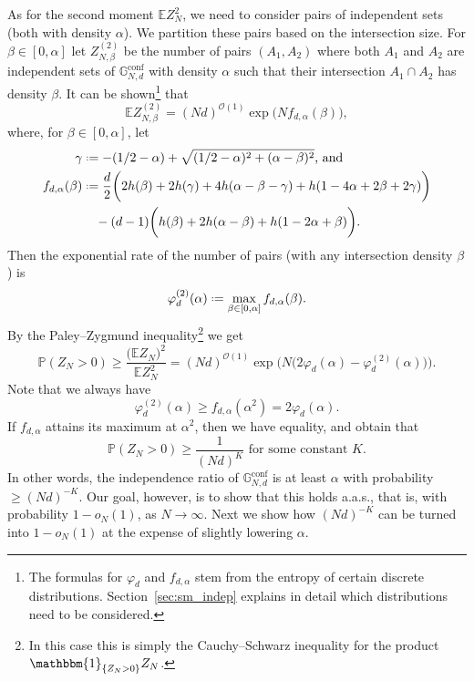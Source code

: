\documentclass[12pt]{amsart}
\theoremstyle{definition}
\newcommand\Eb{\mathbb{E}}  %
\newcommand\Pb{\mathbb{P}}  %
\newcommand\Gbconf{\mathbb{G}^{\textrm{conf}}}
\newcommand\Oc{\mathcal{O}}  %
\newcommand\al{\alpha}
\newcommand\be{\beta}
\newcommand\ga{\gamma}
\newcommand{\defeq}{\mathrel{\vcenter{\baselineskip0.5ex \lineskiplimit0pt
                     \hbox{\scriptsize.}\hbox{\scriptsize.}}}%
                     =}
\newcommand\ind{\mathbbm{1}} %
\begin{document}
As for the second moment $\Eb Z_N^2$, we need to consider pairs of independent sets (both with density $\al$). We partition these pairs based on the intersection size. For $\be \in [0,\al]$ let $Z^{(2)}_{N,\be}$ be the number of pairs $(A_1,A_2)$ where both $A_1$ and $A_2$ are independent sets of $\Gbconf_{N,d}$ with density $\al$ such that their intersection $A_1 \cap A_2$ has density $\be$. It can be shown\footnote{The formulas for $\varphi_d$ and $f_{d,\al}$ stem from the entropy of certain discrete distributions. Section~\ref{sec:sm_indep} explains in detail which distributions need to be considered.} that
%
\[ \Eb Z^{(2)}_{N,\be} =
(Nd)^{\Oc(1)} 
\exp\big( N f_{d,\al}(\be) \big) , \]
%
where, for $\be \in [0,\al]$, let 
%
\begin{align}
\begin{split} \label{eq:f_intro}
\ga &\defeq -(1/2-\al)+\sqrt{(1/2-\al)^2+(\al-\be)^2} \text{, and} \\
f_{d,\al}(\be)  
&\defeq \frac{d}{2} \bigg( 2h(\be)+2h(\ga)
+4h(\al-\be-\ga) + h(1-4\al+2\be+2\ga) \bigg) \\
&\quad - (d-1) \bigg( h(\be)+ 2h(\al-\be) 
+ h(1-2\al+\be) \bigg) .
\end{split}
\end{align} 
%
Then the exponential rate of the number of pairs (with any intersection density $\be$) is 
%
\[ \varphi_d^{(2)}(\al) \defeq 
\max_{\be \in [0,\al]} f_{d,\al}(\be) .\]
%
By the Paley--Zygmund inequality\footnote{In this case this is simply the Cauchy--Schwarz inequality for the product $\ind_{\{Z_N>0\}} Z_N$.} 
we get 
%
\[ \Pb( Z_N > 0 ) 
\geq \frac{\big( \Eb Z_N \big)^2}{\Eb Z_N^2} 
= (Nd)^{\Oc(1)} \exp\big( N 
\big( 2\varphi_d(\al) - \varphi_d^{(2)}(\al) \big) \big) .\]
%
Note that we always have 
%
\[ \varphi_d^{(2)}(\al) \geq f_{d,\al}(\al^2) 
= 2 \varphi_d(\al) .\]
%
If $f_{d,\al}$ attains its maximum at $\al^2$, then we have equality, and obtain that 
%
\begin{equation} \label{eq:weak_ineq}
\Pb( Z_N > 0 ) \geq \frac{1}{(Nd)^K}  
\text{ for some constant } K. 
\end{equation} 
%
In other words, the independence ratio of $\Gbconf_{N,d}$ is at least $\al$ with probability $\geq (Nd)^{-K}$. Our goal, however, is to show that this holds a.a.s., that is, with probability $1-o_N(1)$, as $N \to \infty$. Next we show how $(Nd)^{-K}$ can be turned into $1-o_N(1)$ at the expense of slightly lowering $\al$.
\end{document}
